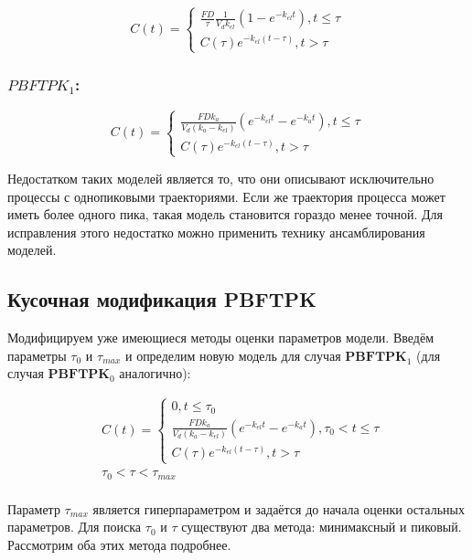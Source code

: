 \documentclass[oneside,senior,etd]{BYUPhys}
\begin{document}
\[
	C(t) = \begin{cases}
		\frac{FD}{\tau} \frac{1}{V_d k_{el}} (1 - e^{-k_{el} t}), t \leq \tau \\
		C(\tau) e^{-k_{el}(t - \tau)}, t > \tau
	\end{cases}
\]

\subsubsection*{$PBFTPK_1$:}

\[
	C(t) = \begin{cases}
		\frac{FD k_a}{V_d (k_a - k_{el})} (e^{-k_{el}t} - e^{-k_a t}), t \leq \tau \\
		C(\tau) e^{-k_{el}(t - \tau)}, t > \tau
	\end{cases}
\]

Недостатком таких моделей является то, что они описывают исключительно процессы с однопиковыми траекториями. Если же траектория процесса может иметь более одного пика, такая модель становится гораздо менее точной. Для исправления этого недостатко можно применить технику ансамблирования моделей.

\subsection{Кусочная модификация PBFTPK}

Модифицируем уже имеющиеся методы оценки параметров модели. Введём параметры $\tau_0$ и $\tau_{max}$ и определим новую модель для случая $\textbf{PBFTPK}_1$ (для случая $\textbf{PBFTPK}_0$ аналогично):

\begin{align*}
	 & C(t) = \begin{cases}
		          0, t \leq \tau_0                                                                    \\
		          \frac{FD k_a}{V_d (k_a - k_{el})} (e^{-k_{el}t} - e^{-k_a t}), \tau_0 < t \leq \tau \\
		          C(\tau) e^{-k_{el}(t - \tau)}, t > \tau
	          \end{cases} \\
	 & \tau_0 < \tau < \tau_{max}                                                                                                                                        \\
\end{align*}

Параметр $\tau_{max}$ является гиперпараметром и задаётся до начала оценки остальных параметров. Для поиска $\tau_0$ и $\tau$ существуют два метода: минимаксный и пиковый. Рассмотрим оба этих метода подробнее.
\end{document}

